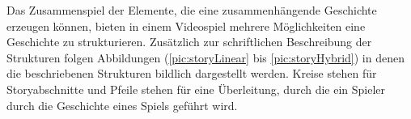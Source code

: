 %
%
%
%
%
%
%
%
%
%
%
\pagebreak

Das Zusammenspiel der Elemente, die eine zusammenhängende Geschichte erzeugen können, bieten in einem Videospiel mehrere Möglichkeiten eine Geschichte zu strukturieren. Zusätzlich zur schriftlichen Beschreibung der Strukturen folgen Abbildungen (\ref{pic:storyLinear} bis \ref{pic:storyHybrid}) in denen die beschriebenen Strukturen bildlich dargestellt werden. Kreise stehen für Storyabschnitte und Pfeile stehen für eine Überleitung, durch die ein Spieler durch die Geschichte eines Spiels geführt wird.

